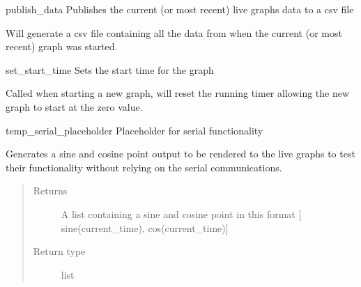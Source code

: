 \documentclass[letterpaper,10pt,english]{sphinxmanual}
\begin{document}
\begin{fulllineitems}
\label{\detokenize{index:graphs.graphing.publish_data}}
publish\_data Publishes the current (or most recent) live graphs data to a csv file

Will generate a csv file containing all the data from when the current (or most recent)
graph was started.

\end{fulllineitems}


\begin{fulllineitems}
\label{\detokenize{index:graphs.graphing.random}}\pysiglinewithargsret{\sphinxcode{\sphinxupquote{graphs.graphing.}}\sphinxbfcode{\sphinxupquote{random}}}{}{{ $\rightarrow$ x in the interval {[}0, 1).}}
\end{fulllineitems}


\begin{fulllineitems}
\label{\detokenize{index:graphs.graphing.set_start_time}}
set\_start\_time Sets the start time for the graph

Called when starting a new graph, will reset the running
timer allowing the new graph to start at the zero value.

\end{fulllineitems}


\begin{fulllineitems}
\label{\detokenize{index:graphs.graphing.temp_serial_placeholder}}
temp\_serial\_placeholder Placeholder for serial functionality

Generates a sine and cosine point output to be rendered to the
live graphs to test their functionality without relying on the
serial communications.
\begin{quote}\begin{description}
\item[{Returns}] \leavevmode
A list containing a sine and cosine point in this format {[} sine(current\_time), cos(current\_time){]}

\item[{Return type}] \leavevmode
list

\end{description}\end{quote}

\end{fulllineitems}
\end{document}
